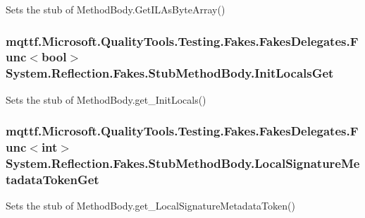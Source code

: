 Sets the stub of Method\-Body.\-Get\-I\-L\-As\-Byte\-Array()

\hypertarget{class_system_1_1_reflection_1_1_fakes_1_1_stub_method_body_a6d6096a6139005f42be93bcfbf05a36f}{
\subsubsection[{Init\-Locals\-Get}]{\setlength{\rightskip}{0pt plus 5cm}mqttf.\-Microsoft.\-Quality\-Tools.\-Testing.\-Fakes.\-Fakes\-Delegates.\-Func$<$bool$>$ System.\-Reflection.\-Fakes.\-Stub\-Method\-Body.\-Init\-Locals\-Get}}\label{class_system_1_1_reflection_1_1_fakes_1_1_stub_method_body_a6d6096a6139005f42be93bcfbf05a36f}


Sets the stub of Method\-Body.\-get\-\_\-\-Init\-Locals()

\hypertarget{class_system_1_1_reflection_1_1_fakes_1_1_stub_method_body_a5fc5c98144baf1db1e7d98a6c39e3bd0}{
\subsubsection[{Local\-Signature\-Metadata\-Token\-Get}]{\setlength{\rightskip}{0pt plus 5cm}mqttf.\-Microsoft.\-Quality\-Tools.\-Testing.\-Fakes.\-Fakes\-Delegates.\-Func$<$int$>$ System.\-Reflection.\-Fakes.\-Stub\-Method\-Body.\-Local\-Signature\-Metadata\-Token\-Get}}\label{class_system_1_1_reflection_1_1_fakes_1_1_stub_method_body_a5fc5c98144baf1db1e7d98a6c39e3bd0}


Sets the stub of Method\-Body.\-get\-\_\-\-Local\-Signature\-Metadata\-Token()

